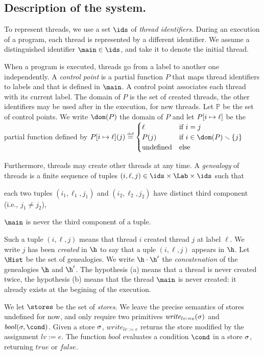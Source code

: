 \documentclass[12pt]{article}
\newcommand{\egdef}{\stackrel{\text{\tiny def}}{=}}
\newcounter{labels}[figure]
\newcommand{\ecr}{\mathit{write}}
\newcommand{\evb}{\mathit{bool}}
\newcommand{\vrai}{\mathit{true}}
\newcommand{\faux}{\mathit{false}}
\begin{document}
\subsection{Description of the system.} To represent threads, we use a set \(\ids\) of \emph{thread identifiers}. During an execution of a program, each thread is represented by a different identifier.
We assume a distinguished identifier \(\main \in\ids\), and take it to denote the initial thread.

When a program is executed, 
threads go from a label to another one independently.
A \emph{control point} is a partial function \(P\) that maps thread identifiers to labels and that is defined in \(\main\). 
A control point associates each thread with its current label. The domain of \(P\) is the set of created threads, the other identifiers may be used after in the execution, for new threads. Let \(\mathbb{P}\) be the set of control points.
We write \(\dom(P)\) the domain of \(P\) and let \(P[i \mapsto \ell]\) be the partial function defined by   \(\fx{P}{i}{\ell}(j)\egdef
\begin{cases}
 \ell & \text{if }i=j\\
 P(j) &\text{if }i\in\dom(P)\smallsetminus\{j\}\\
 \text{undefined}& \text{else}\\
\end{cases}
\)

Furthermore, threads may create other threads at any time. A \emph{genealogy} of threads is a finite sequence of tuples \((i,\ell,j)\in\ids\times\Lab\times\ids\) such that 
\begin{inparaenum}[(a)]
 \item each two tuples \((i_1,\ell_1,j_1)\) and \((i_2,\ell_2,j_2)\) have distinct third component (i.e., \(j_1\neq j_2\)),
 \item \(\main\) is never the third component of a tuple.
\end{inparaenum}
Such a tuple \((i,\ell,j)\) means that thread \(i\) created thread \(j\) at label \(\ell\). We write \(j\) has been \emph{created} in \(\h\) to say that a uple \((i,\ell,j)\) appears in \(\h\). Let \(\Hist\) be the set of genealogies. We write \(\h\cdot \h'\) the \emph{concatenation} of the genealogies \(\h\) and \(\h'\).
The hypothesis (a) means that a thread is never created twice, the hypothesis (b) means that the thread  \(\main\) is never created: it already exists at the begining of the execution.

We let \(\stores\) be the set of \emph{stores}.
We leave the precise semantics of stores undefined for now, and only require two primitives 
 \(\ecr_{lv:=e}(\m)\) and \(\evb(\m,\cond)\). Given a store \(\sigma\), \(\ecr_{lv:=e}\) returns the store modified by the assignment \(lv:=e\). 
 The function \(\evb\) evaluates a condition \(\cond\) in a store \(\sigma\), returning \(\vrai\) or \(\faux\).
\end{document}
